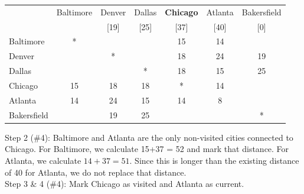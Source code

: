 \begin{example}{}{}
 \begin{center}
 \begin{tabular}{|l|c|c|c|c|c|c|}
 \hline
 & Baltimore & \cellcolor{yellow}Denver &  \cellcolor{yellow}Dallas & \textbf{Chicago} & Atlanta & \cellcolor{yellow}Bakersfield\\
 && \cellcolor{yellow}[19]& \cellcolor{yellow}[25]&[37]&[40]&\cellcolor{yellow}[0]\\
 \hline
 Baltimore & * & \cellcolor{yellow}& \cellcolor{yellow}&15&14&\cellcolor{yellow}\\
 \hline
 \cellcolor{yellow} Denver & \cellcolor{yellow}& \cellcolor{yellow}*& \cellcolor{yellow}& \cellcolor{yellow}18& \cellcolor{yellow}24&\cellcolor{yellow}19\\
 \hline
 \cellcolor{yellow}Dallas& \cellcolor{yellow}& \cellcolor{yellow}& \cellcolor{yellow}*& \cellcolor{yellow}18& \cellcolor{yellow}15&\cellcolor{yellow}25\\
 \hline
 Chicago &15& \cellcolor{yellow}18& \cellcolor{yellow}18&*&14&\cellcolor{yellow}\\
 \hline
 Atlanta & 14 &  \cellcolor{yellow}24& \cellcolor{yellow}15&14&8&\cellcolor{yellow}\\
 \hline
 \cellcolor{yellow}Bakersfield &\cellcolor{yellow}&\cellcolor{yellow}19&\cellcolor{yellow}25&\cellcolor{yellow}&\cellcolor{yellow}&\cellcolor{yellow}*\\
 \hline
 \end{tabular}
 \end{center}



\noindent Step 2 (\#4):  Baltimore and Atlanta are the only non-visited cities connected to Chicago.  For Baltimore, we calculate 15+37 = 52 and mark that distance.  For Atlanta, we calculate $14+37 = 51$.  Since this is longer than the existing distance of 40 for Atlanta, we do not replace that distance.\\


\noindent Step 3 \& 4 (\#4):  Mark Chicago as visited and Atlanta as current.


\end{example}
